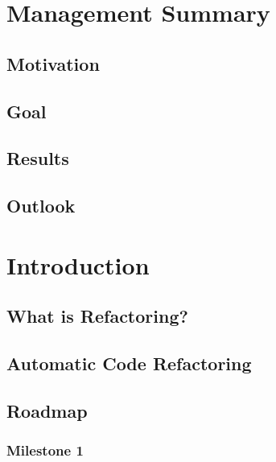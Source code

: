 \documentclass[12pt,halfparskip]{scrreprt}
\begin{document}
\chapter*{Management Summary}

\section*{Motivation}

\section*{Goal}

\section*{Results}

\section*{Outlook}


\newpage

\tableofcontents

\newpage
{}
\pagestyle{scrheadings}

\chapter{Introduction}

\section{What is Refactoring?}


\section{Automatic Code Refactoring}

\section{Roadmap}

\subsection{Milestone 1}
\end{document}

